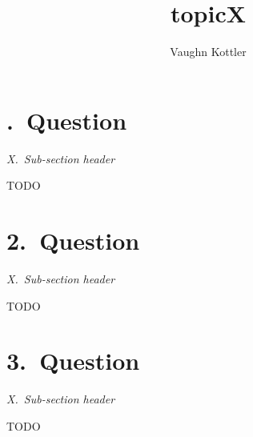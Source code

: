\documentclass[letterpaper,10pt]{article}
\title{topicX}
\author{Vaughn Kottler}
\begin{document}
\section*{.\ Question
}

\textit{X.\ Sub-section header\break}

\begin{adjustwidth}{0.5in}{0in}\small
TODO
\end{adjustwidth}

\section*{2.\ Question}

\textit{X.\ Sub-section header\break}

\begin{adjustwidth}{0.5in}{0in}\small
TODO
\end{adjustwidth}

\section*{3.\ Question}

\textit{X.\ Sub-section header\break}

\begin{adjustwidth}{0.5in}{0in}\small
TODO
\end{adjustwidth}
\end{document}
